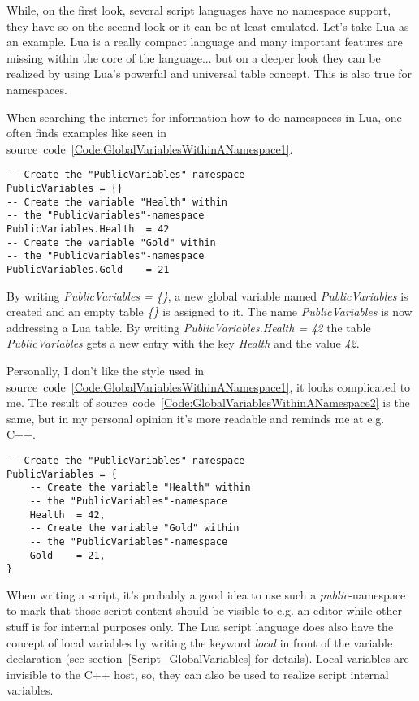While, on the first look, several script languages have no namespace support, they have so on the second look or it can be at least emulated. Let's take Lua as an example. Lua is a really compact language and many important features are missing within the core of the language... but on a deeper look they can be realized by using Lua's powerful and universal table concept. This is also true for namespaces.

When searching the internet for information how to do namespaces in Lua, one often finds examples like seen in source~code~\ref{Code:GlobalVariablesWithinANamespace1}.
\begin{lstlisting}[float=htb,label=Code:GlobalVariablesWithinANamespace1,caption={Global variables within a namespace (1)}]
-- Create the "PublicVariables"-namespace
PublicVariables = {}
-- Create the variable "Health" within
-- the "PublicVariables"-namespace
PublicVariables.Health	= 42
-- Create the variable "Gold" within
-- the "PublicVariables"-namespace
PublicVariables.Gold	= 21
\end{lstlisting}
By writing \emph{PublicVariables = \{\}}, a new global variable named \emph{PublicVariables} is created and an empty table \emph{\{\}} is assigned to it. The name \emph{PublicVariables} is now addressing a Lua table. By writing \emph{PublicVariables.Health = 42} the table \emph{PublicVariables} gets a new entry with the key \emph{Health} and the value \emph{42}.

Personally, I don't like the style used in source~code~\ref{Code:GlobalVariablesWithinANamespace1}, it looks complicated to me. The result of source~code~\ref{Code:GlobalVariablesWithinANamespace2} is the same, but in my personal opinion it's more readable and reminds me at e.g. C++.
\begin{lstlisting}[float=htb,label=Code:GlobalVariablesWithinANamespace2,caption={Global variables within a namespace (2)}]
-- Create the "PublicVariables"-namespace
PublicVariables = {
	-- Create the variable "Health" within
	-- the "PublicVariables"-namespace
	Health	= 42,
	-- Create the variable "Gold" within
	-- the "PublicVariables"-namespace
	Gold	= 21,
}
\end{lstlisting}

When writing a script, it's probably a good idea to use such a \emph{public}-namespace to mark that those script content should be visible to e.g. an editor while other stuff is for internal purposes only. The Lua script language does also have the concept of local variables by writing the keyword \emph{local} in front of the variable declaration (see section~\ref{Script_GlobalVariables} for details). Local variables are invisible to the C++ host, so, they can also be used to realize script internal variables.

